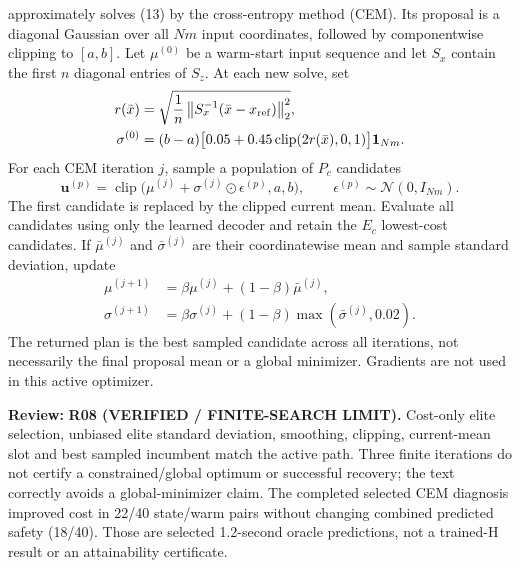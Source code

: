 \documentclass[11pt]{article}
\newcommand{\clip}{\operatorname{clip}}
\newcommand{\review}[1]{\par\noindent\textcolor{red!70!black}{\textbf{Review:} #1}\par}
\newcommand{\code}[1]{\texttt{\detokenize{#1}}}
\begin{document}
\code{DataDrivenCEMSolver} approximately solves (13) by the cross-entropy method (CEM). Its proposal is a diagonal Gaussian over all $Nm$ input coordinates, followed by componentwise clipping to $[a,b]$. Let $\mu^{(0)}$ be a warm-start input sequence and let $S_x$ contain the first $n$ diagonal entries of $S_z$. At each new solve, set
\begin{align}
r(\bar x)&=\sqrt{\frac1n\left\|S_x^{-1}(\bar x-x_{\rm ref})\right\|_2^2},\label{eq:radius}\\
\sigma^{(0)}&=(b-a)\bigl[0.05+0.45\clip(2r(\bar x),0,1)\bigr]\mathbf1_{Nm}.\label{eq:std}
\end{align}
For each CEM iteration $j$, sample a population of $P_c$ candidates
\begin{equation}\label{eq:candidates}
\mathbf u^{(p)}=\clip\bigl(\mu^{(j)}+\sigma^{(j)}\odot\epsilon^{(p)},a,b\bigr),\qquad
\epsilon^{(p)}\sim\mathcal N(0,I_{Nm}).
\end{equation}
The first candidate is replaced by the clipped current mean. Evaluate all candidates using only the learned decoder and retain the $E_c$ lowest-cost candidates. If $\bar\mu^{(j)}$ and $\bar\sigma^{(j)}$ are their coordinatewise mean and sample standard deviation, update
\begin{align}
\mu^{(j+1)}&=\beta\mu^{(j)}+(1-\beta)\bar\mu^{(j)},\label{eq:cemmean}\\
\sigma^{(j+1)}&=\beta\sigma^{(j)}+(1-\beta)\max(\bar\sigma^{(j)},0.02).\label{eq:cemstd}
\end{align}
The returned plan is the best sampled candidate across all iterations, not necessarily the final proposal mean or a global minimizer. Gradients are not used in this active optimizer.
\review{\textbf{R08 (VERIFIED / FINITE-SEARCH LIMIT).} Cost-only elite selection, unbiased elite standard deviation, smoothing, clipping, current-mean slot and best sampled incumbent match the active path. Three finite iterations do not certify a constrained/global optimum or successful recovery; the text correctly avoids a global-minimizer claim. The completed selected CEM diagnosis improved cost in 22/40 state/warm pairs without changing combined predicted safety (18/40). Those are selected 1.2-second oracle predictions, not a trained-H result or an attainability certificate.}
\end{document}
